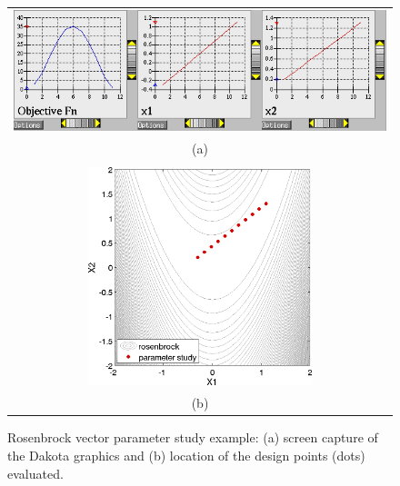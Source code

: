\begin{figure}[htp!]
  \centering
  \begin{tabular}{c}
  \includegraphics[width=\textwidth]{images/dak_graphics_vector}\\
  (a)\\
  \qquad\\
  \includegraphics[height=2.5in]{images/rosen_vect_pts} \\
  (b)
  \end{tabular}
  \caption{Rosenbrock vector parameter study example: (a) screen
    capture of the Dakota graphics and (b) location of the design
    points (dots) evaluated.}
  \label{additional:rosenbrock_vector_graphics}
\end{figure}
